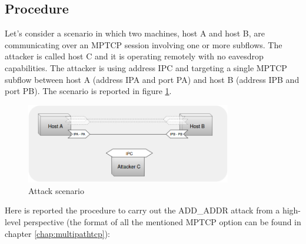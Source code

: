 \subsection{Procedure}
Let's consider a scenario in which two machines, host A and host B, are communicating over an MPTCP session involving one or more subflows. The attacker is called host C and it is operating remotely with no eavesdrop capabilities. The attacker is using address IPC and targeting a single MPTCP subflow between host A (address IPA and port PA) and host B (address IPB and port PB). The scenario is reported in figure \ref{fig:attack1}.

\begin{figure}[!htb]
\centering
\includegraphics[width=0.8\textwidth]{images/Attack1}
\caption{Attack scenario}
\label{fig:attack1}
\end{figure}

Here is reported the procedure to carry out the ADD\_ADDR attack from a high-level perspective (the format of all the mentioned MPTCP option can be found in chapter \ref{chap:multipathtcp}):


